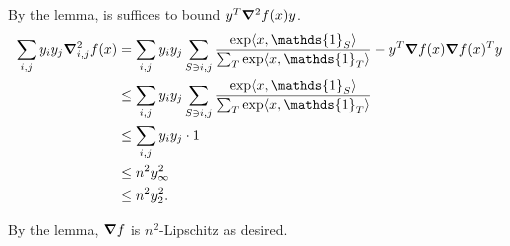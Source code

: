 \documentclass[10pt]{article}
\DeclarePairedDelimiter{\iprod}{\langle}{\rangle}
\let\norm\relax
\DeclarePairedDelimiter{\norm}{\lVert}{\rVert}
\newcommand{\ones}{\mathds{1}}
\begin{document}
By the lemma,
is suffices to bound $y^T \grad^2 f(x) y$.
\begin{align*}
  \sum_{i, j} y_iy_j \grad_{i, j}^2 f(x)
  &= \sum_{i, j} y_i y_j \sum_{S\ni i, j} \frac{\exp\iprod{x, \ones_S}}{\sum_T \exp\iprod{x, \ones_T}} - y^T\grad f(x)\grad f(x)^T y \\
  &\leq \sum_{i, j} y_i y_j \sum_{S\ni i, j} \frac{\exp\iprod{x, \ones_S}}{\sum_T \exp\iprod{x, \ones_T}} \\
  &\leq \sum_{i, j} y_i y_j\cdot 1 \\
  &\leq n^2 \norm{y}_\infty^2 \\
  &\leq n^2 \norm{y}_2^2.
\end{align*}

By the lemma,
$\grad f$ is $n^2$-Lipschitz as desired.
\end{document}
